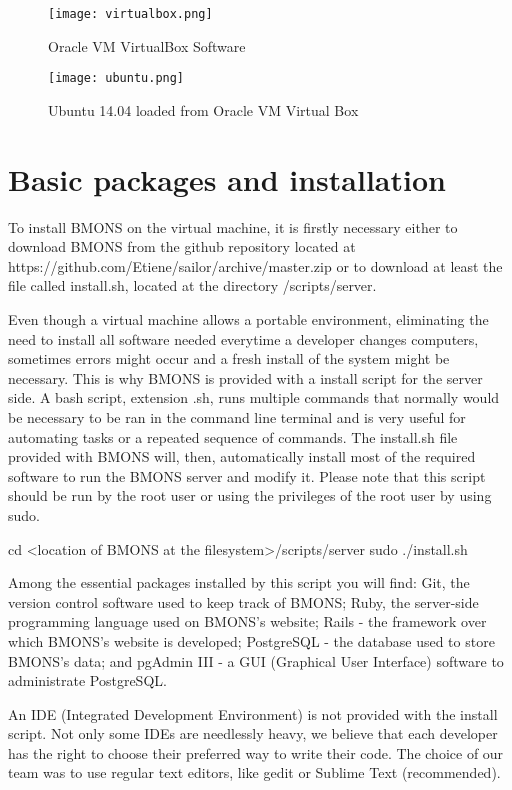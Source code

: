 \begin{figure}[h]
\centering\texttt{[image: virtualbox.png]}
\caption{\label{fig:virtualbox} Oracle VM VirtualBox Software}
\end{figure}

\begin{figure}[h]
\centering\texttt{[image: ubuntu.png]}
\caption{\label{fig:ubuntu} Ubuntu 14.04 loaded from Oracle VM Virtual Box}
\end{figure}

\section{Basic packages and installation}

To install BMONS on the virtual machine, it is firstly necessary either to download BMONS from the github repository located at https://github.com/Etiene/sailor/archive/master.zip or to download at least the file called install.sh, located at the directory /scripts/server.

Even though a virtual machine allows a portable environment, eliminating the need to install all software needed everytime a developer changes computers, sometimes errors might occur and a fresh install of the system might be necessary. This is why BMONS is provided with a install script for the server side. A bash script, extension .sh, runs multiple commands that normally would be necessary to be ran in the command line terminal and is very useful for automating tasks or a repeated sequence of commands. The install.sh file provided with BMONS will, then, automatically install most of the required software to run the BMONS server and modify it. Please note that this script should be run by the root user or using the privileges of the root user by using sudo.

cd <location of BMONS at the filesystem>/scripts/server
sudo ./install.sh

Among the essential packages installed by this script you will find: Git, the version control software used to keep track of BMONS; Ruby, the server-side programming language used on BMONS's website; Rails - the framework over which BMONS's website is developed; PostgreSQL - the database used to store BMONS's data; and pgAdmin III - a GUI (Graphical User Interface) software to administrate PostgreSQL.

An IDE (Integrated Development Environment) is not provided with the install script. Not only some IDEs are needlessly heavy, we believe that each developer has the right to choose their preferred way to write their code. The choice of our team was to use regular text editors, like gedit or Sublime Text (recommended).

